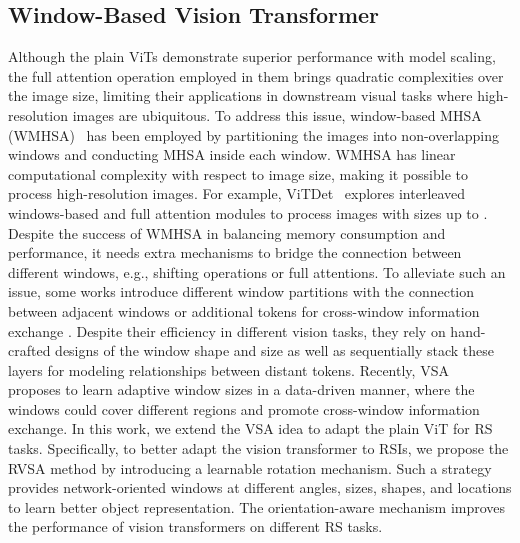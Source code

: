 \documentclass[10pt, journal,twoside]{IEEEtran}
\begin{document}
 

\subsection{Window-Based Vision Transformer}
Although the plain ViTs demonstrate superior performance with model scaling, the full attention operation employed in them brings quadratic complexities over the image size, limiting their applications in downstream visual tasks where high-resolution images are ubiquitous. To address this issue, window-based MHSA (WMHSA)~\cite{swint} has been employed by partitioning the images into non-overlapping windows and conducting MHSA inside each window. WMHSA has linear computational complexity with respect to image size, making it possible to process high-resolution images. For example, ViTDet~\cite{vitdet} explores interleaved windows-based and full attention modules to process images with sizes up to . Despite the success of WMHSA in balancing memory consumption and performance, it needs extra mechanisms to bridge the connection between different windows, e.g., shifting operations or full attentions. To alleviate such an issue, some works introduce different window partitions with the connection between adjacent windows or additional tokens for cross-window information exchange \cite{cswin,pale}. Despite their efficiency in different vision tasks, they rely on hand-crafted designs of the window shape and size as well as sequentially stack these layers for modeling relationships between distant tokens. Recently, VSA~\cite{zhang2022vsa} proposes to learn adaptive window sizes in a data-driven manner, where the windows could cover different regions and promote cross-window information exchange. In this work, we extend the VSA idea to adapt the plain ViT for RS tasks. Specifically, to better adapt the vision transformer to RSIs, we propose the RVSA method by introducing a learnable rotation mechanism. Such a strategy provides network-oriented windows at different angles, sizes, shapes, and locations to learn better object representation. The orientation-aware mechanism improves the performance of vision transformers on different RS tasks. 
 
\end{document}
